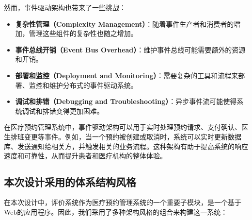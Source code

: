 然而，事件驱动架构也带来了一些挑战：

\begin{itemize}
	\item \textbf{复杂性管理（Complexity Management）}：随着事件生产者和消费者的增加，管理这些组件的复杂性也随之增加。
	
	\item \textbf{事件总线开销（Event Bus Overhead）}：维护事件总线可能需要额外的资源和开销。
	
	\item \textbf{部署和监控（Deployment and Monitoring）}：需要复杂的工具和流程来部署、监控和维护分布式的事件驱动系统。
	
	\item \textbf{调试和排错（Debugging and Troubleshooting）}：异步事件流可能使得系统调试和排错变得更加困难。
\end{itemize}

在医疗预约管理系统中，事件驱动架构可以用于实时处理预约请求、支付确认、医生排班变更等事件。例如，当一个预约被创建或取消时，系统可以实时更新数据库、发送通知给相关方，并触发相关的业务流程。这种架构有助于提高系统的响应速度和可靠性，从而提升患者和医疗机构的整体体验。


\subsection{本次设计采用的体系结构风格}
在本次设计中，评价系统作为医疗预约管理系统的一个重要子模块，是一个基于Web的应用程序。因此，我们采用了多种架构风格的组合来构建这一系统：

